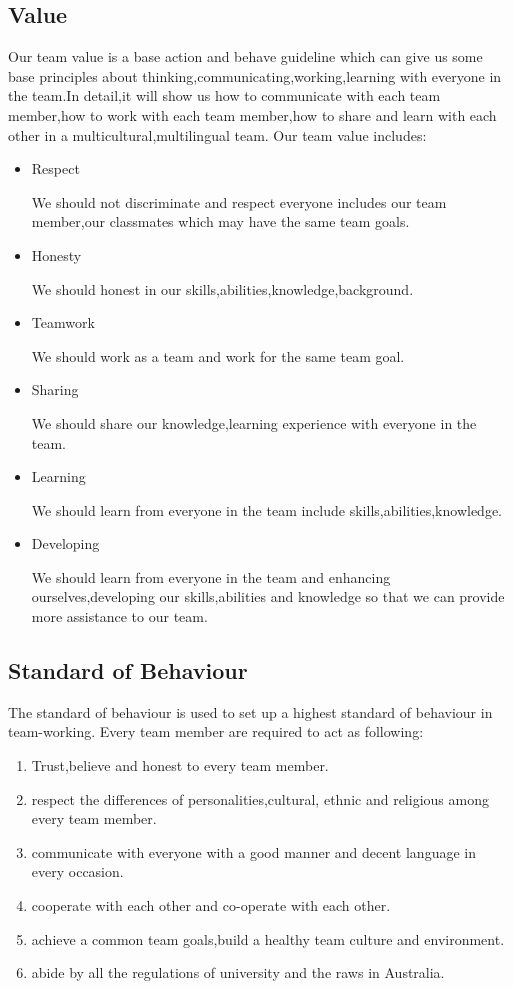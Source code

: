 \documentclass[11pt]{article}
\begin{document}
\subsection{Value}
Our team value is a base action and behave guideline which can give us some base principles about thinking,communicating,working,learning with everyone in the team.In detail,it will show us how to communicate with each team member,how to work with each team member,how to share and learn with each other in a multicultural,multilingual team. Our team value includes:
\begin{itemize}
\item Respect
\par\setlength\parindent{2em} We should not discriminate and respect everyone includes our team member,our classmates which may have the same team goals. 
\item Honesty
\par\setlength\parindent{2em} We should honest in our skills,abilities,knowledge,background.
\item Teamwork
\par\setlength\parindent{2em} We should work as a team and work for the same team goal.
\item Sharing
\par\setlength\parindent{2em} We should share our knowledge,learning experience with everyone in the team.
\item Learning
\par\setlength\parindent{2em}  We should learn from everyone in the team include skills,abilities,knowledge.
\item Developing
\par\setlength\parindent{2em} We should learn from everyone in the team and enhancing ourselves,developing our skills,abilities and knowledge so that we can provide more assistance to our team.
	 \end{itemize} 
\par\setlength\parindent{2em}
\subsection{Standard of Behaviour} 
The standard of behaviour is used to set up a highest standard of behaviour in team-working.
Every team member are required to act as following:
\begin{enumerate}
	\item Trust,believe and honest to every team member.
	\item respect the differences of personalities,cultural, ethnic and religious among every team member.
	\item communicate with everyone with a good manner and decent language in every  occasion.
	\item cooperate with each other and co-operate with each other.
	\item achieve a common team goals,build a healthy team culture and environment.
	\item abide by all the regulations of university and the raws in Australia.
\end{enumerate}
\par\setlength\parindent{2em}
\end{document}
